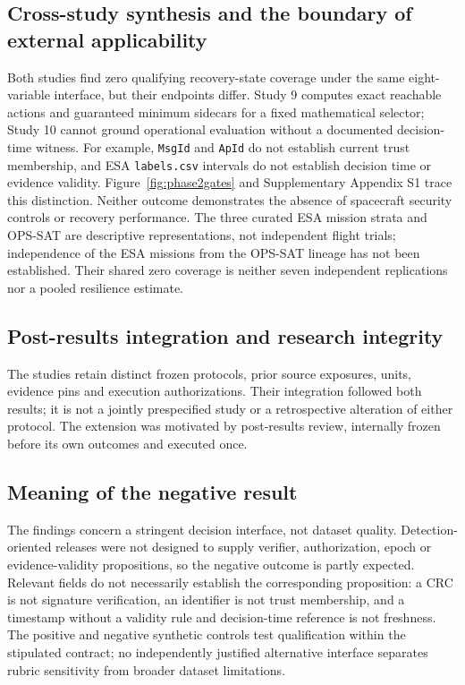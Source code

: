 \documentclass[preprint,12pt]{elsarticle}
\begin{document}
\subsection{Cross-study synthesis and the boundary of external applicability}
Both studies find zero qualifying recovery-state coverage under the same eight-variable interface, but their endpoints differ. Study 9 computes exact reachable actions and guaranteed minimum sidecars for a fixed mathematical selector; Study 10 cannot ground operational evaluation without a documented decision-time witness. For example, \texttt{MsgId} and \texttt{ApId} do not establish current trust membership, and ESA \texttt{labels.csv} intervals do not establish decision time or evidence validity. Figure~\ref{fig:phase2gates} and Supplementary Appendix S1 trace this distinction. Neither outcome demonstrates the absence of spacecraft security controls or recovery performance. The three curated ESA mission strata and OPS-SAT are descriptive representations, not independent flight trials; independence of the ESA missions from the OPS-SAT lineage has not been established. Their shared zero coverage is neither seven independent replications nor a pooled resilience estimate.

\subsection{Post-results integration and research integrity}
The studies retain distinct frozen protocols, prior source exposures, units, evidence pins and execution authorizations. Their integration followed both results; it is not a jointly prespecified study or a retrospective alteration of either protocol. The extension was motivated by post-results review, internally frozen before its own outcomes and executed once.

\subsection{Meaning of the negative result}
The findings concern a stringent decision interface, not dataset quality. Detection-oriented releases were not designed to supply verifier, authorization, epoch or evidence-validity propositions, so the negative outcome is partly expected. Relevant fields do not necessarily establish the corresponding proposition: a CRC is not signature verification, an identifier is not trust membership, and a timestamp without a validity rule and decision-time reference is not freshness. The positive and negative synthetic controls test qualification within the stipulated contract; no independently justified alternative interface separates rubric sensitivity from broader dataset limitations.
\end{document}
